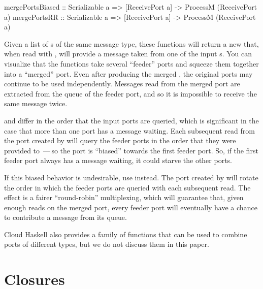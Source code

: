 \documentclass{sigplanconf}
\newcommand\apb[1]{\nb{apb}{#1}}
\begin{document}
\begin{code}
mergePortsBiased :: Serializable a => [ReceivePort a] -> ProcessM (ReceivePort a)
mergePortsRR :: Serializable a => [ReceivePort a] -> ProcessM (ReceivePort a)
\end{code}

Given a list of s of the same message type, these functions will return a new  that, when read with , will provide a message taken from one of the input s. You can visualize that the  functions take several ``feeder'' ports and squeeze them together into a ``merged'' port. Even after producing the merged , the original ports may continue to be used independently. Messages read from the merged port are extracted from the queue of the feeder port, and so it is impossible to receive the same message twice.

 and  differ in the order that the input ports are queried, which is significant in the case that more than one port has a message waiting. Each subsequent read from the port created by  will query the feeder ports in the order that they were provided to \,---\,so the port is ``biased'' towards the first feeder port. 
So, if the first feeder port always has a message waiting, it could starve the other ports.

If this biased behavior is undesirable, use  instead. The port created by  will rotate the order in which the feeder ports are queried with each subsequent read. The effect is a fairer ``round-robin'' multiplexing, which will guarantee that, given enough reads on the merged port, every feeder port will eventually have a chance to contribute a message from its queue.

Cloud Haskell also provides a family of  functions that can be used to combine ports of different types, but we do not discuss them in this paper.

\section{Closures}
\label{s:closures}
\end{document}
